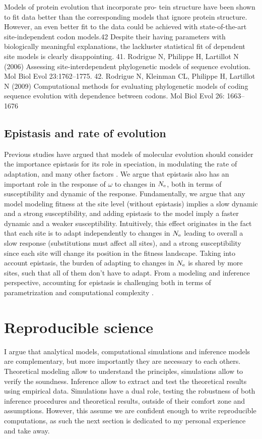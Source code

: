 Models of protein evolution that incorporate pro-
tein structure have been shown to fit data better than the corresponding models that ignore protein structure. However, an even better fit to the data could be achieved with state-of-the-art site-independent \gls{codon} models.42 Despite their having parameters with biologically meaningful explanations, the lackluster statistical fit of dependent site models is clearly disappointing.
41. Rodrigue N, Philippe H, Lartillot N (2006) Assessing site-interdependent phylogenetic models of sequence evolution. Mol Biol Evol 23:1762–1775.
42. Rodrigue N, Kleinman CL, Philippe H, Lartillot N (2009) Computational methods for evaluating phylogenetic models of coding sequence evolution with dependence between \glspl{codon}. Mol Biol Evol 26: 1663–1676

\subsection{Epistasis and rate of evolution}

Previous studies have argued that models of molecular evolution should consider the importance epistasis for its role in speciation, in modulating the rate of adaptation, and many other factors \citep{Goldstein2017, Miller2018}.
We argue that epistasis also has an important role in the response of $\omega$ to changes in $N_{\textrm{e}}$, both in terms of susceptibility and dynamic of the response.
Fundamentally, we argue that any model modeling fitness at the site level (without epistasis) implies a slow dynamic and a strong susceptibility, and adding epistasis to the model imply a faster dynamic and a weaker susceptibility.
Intuitively, this effect originates in the fact that each site is to adapt independently to changes in $N_{\textrm{e}}$ leading to overall a slow response (substitutions must affect all sites), and a strong susceptibility since each site will change its position in the fitness landscape.
Taking into account epistasis, the burden of adapting to changes in $N_{\textrm{e}}$ is shared by more sites, such that all of them don't have to adapt. 
From a modeling and inference perspective, accounting for epistasis is challenging both in terms of parametrization and computational complexity \citep{Rodrigue2005, Manhart2014}. 


\section{Reproducible science}
I argue that analytical models, computational simulations and inference models are complementary, but more importantly they are necessary to each others. 
Theoretical modeling allow to understand the principles, simulations allow to verify the soundness.
Inference allow to extract and test the theoretical results using empirical data.
Simulations have a dual role, testing the robustness of both inference procedures and theoretical results, outside of their comfort zone and assumptions.
However, this assume we are confident enough to write reproducible computations, as such the next section is dedicated to my personal experience and take away.

